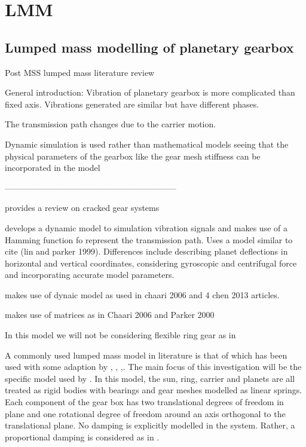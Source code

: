 
\chapter{LMM}

\section{Lumped mass modelling of planetary gearbox}
Post MSS lumped mass literature review


General introduction:
Vibration of planetary gearbox is more complicated than fixed axis. Vibrations generated are similar but have different phases. 

The transmission path changes due to the carrier motion.

Dynamic simulation is used rather than mathematical models seeing that the physical parameters of the gearbox like the gear mesh stiffness can be incorporated in the model \cite{Liang2015}

--------------------------------------------------------------

\cite{Ma2015} provides a review on cracked gear systems

\cite{Liang2015} develops a dynamic model to simulation vibration signals and makes use of a Hamming function fo represent the transmission path. Uses a model similar to cite (lin and parker 1999). Differences include describing planet deflections in horizontal and vertical coordinates, considering gyroscopic and centrifugal force and incorporating accurate model parameters.

\cite{Chen 2015} makes use of dynaic model as used in chaari 2006  and 4 chen 2013 articles.

\cite{Chen2013} makes use of matrices as in Chaari 2006 and Parker 2000

In this model we will not be considering flexible ring gear as in \cite{Chen2015}


A commonly used lumped mass model in literature is that of \cite{Kahraman1994} which has been used with some adaption by  \cite{Lin1999}, \cite{Chaari2006}, \cite{Chen2013},\cite{Chen2015}. The main focus of this investigation will be the specific model used by \cite{Lin1999}. In this model, the sun, ring, carrier and planets are all treated as rigid bodies with bearings and gear meshes modelled as linear springs. Each component of the gear box has two translational degrees of freedom in plane and one rotational degree of freedom around an axis orthogonal to the translational plane. No damping is explicitly modelled in the system. Rather, a proportional damping is considered as in \cite{Chaari2006}.

